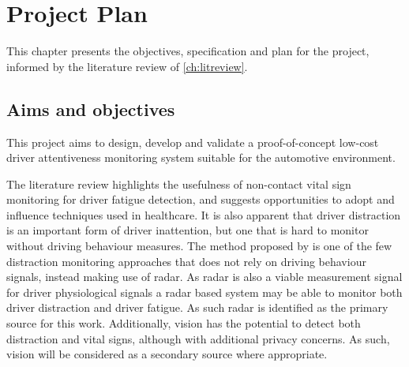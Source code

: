 \documentclass[11pt, parskip=half*,twoside=false]{scrbook}
\begin{document}
{%
%
%
%

\chapter{Project Plan} \label{ch:plan}
This chapter presents the objectives, specification and plan for the project, informed by the literature review of \cref{ch:litreview}.

\section{Aims and objectives}
This project aims to design, develop and validate a proof-of-concept low-cost driver attentiveness monitoring system suitable for the automotive environment.

The literature review highlights the usefulness of non-contact vital sign monitoring for driver fatigue detection, and suggests opportunities to adopt and influence techniques used in healthcare. It is also apparent that driver distraction is an important form of driver inattention, but one that is hard to monitor without driving behaviour measures. The method proposed by \citet{dingInattentiveDrivingBehavior2019} is one of the few distraction monitoring approaches that does not rely on driving behaviour signals, instead making use of radar. As radar is also a viable measurement signal for driver physiological signals a radar based system may be able to monitor both driver distraction and driver fatigue.  As such radar is identified as the primary source for this work. Additionally, vision has the potential to detect both distraction and vital signs, although with additional privacy concerns. As such, vision will be considered as a secondary source where appropriate.

}
\end{document}
